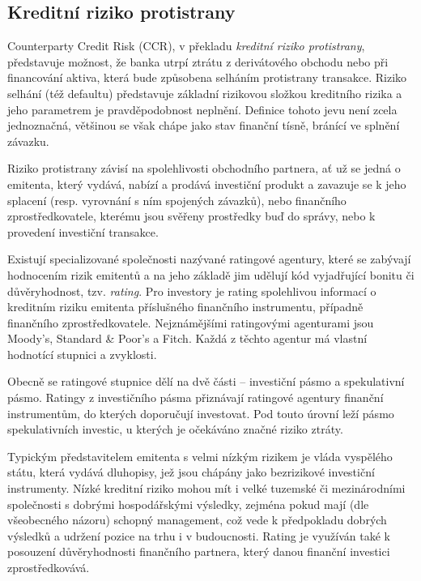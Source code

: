\documentclass[a4paper,12pt]{report}
\theoremstyle{definition} \newtheorem{definice}[veta]{Definice}
\theoremstyle{remark}
\begin{document}
\subsection{Kreditní riziko protistrany}\label{CCR_kap}
Counterparty Credit Risk (CCR), v překladu \textit{kreditní riziko protistrany},  představuje možnost, že banka utrpí ztrátu z derivátového obchodu nebo při financování aktiva, která bude způsobena selháním protistrany transakce. 
Riziko selhání (též defaultu) představuje základní rizikovou složkou kreditního rizika a jeho parametrem je pravděpodobnost neplnění. 
Definice tohoto jevu není zcela jednoznačná, většinou se však chápe jako stav finanční tísně, bránící ve splnění závazku.

Riziko protistrany závisí na spolehlivosti obchodního partnera, ať už se jedná o emitenta, který vydává, nabízí a prodává investiční produkt a zavazuje se k jeho splacení (resp. vyrovnání s ním spojených závazků), nebo finančního zprostředkovatele, kterému jsou svěřeny prostředky buď do správy, nebo k provedení investiční transakce.

Existují specializované společnosti nazývané ratingové agentury, které se zabývají hodnocením rizik emitentů %
a na jeho základě jim udělují kód vyjadřující bonitu či důvěryhodnost, tzv. \textit{rating}.
Pro investory je rating spolehlivou informací o kreditním riziku emitenta příslušného finančního instrumentu, případně finančního zprostředkovatele. 
Nejznámějšími ratingovými agenturami jsou Moody's, Standard \& Poor's a Fitch. Každá z těchto agentur má vlastní hodnotící stupnici a zvyklosti.

Obecně se ratingové stupnice dělí na dvě části -- investiční pásmo a spekulativní pásmo.
Ratingy z investičního pásma přiznávají ratingové agentury finanční instrumentům, do kterých doporučují investovat. Pod touto úrovní leží pásmo spekulativních investic, u kterých je očekáváno značné riziko ztráty.

Typickým představitelem emitenta s velmi nízkým rizikem je vláda vyspělého státu, která vydává dluhopisy, jež jsou chápány jako bezrizikové  investiční instrumenty. Nízké kreditní riziko mohou mít i velké tuzemské či mezinárodními společnosti s dobrými hospodářskými výsledky, zejména pokud mají (dle všeobecného názoru) schopný management, což vede k předpokladu dobrých výsledků a udržení pozice na trhu i v budoucnosti.
Rating je využíván také k posouzení  důvěryhodnosti finančního partnera, který danou finanční investici zprostředkovává.
\end{document}
